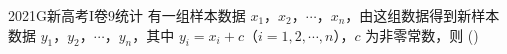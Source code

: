 
\begin{problem}{2021}{G}{新高考I卷}{9}{统计}
有一组样本数据 $ x_1 $，$ x_2 $，$ \cdots $，$ x_n $，由这组数据得到新样本数据 $ y_1 $，$ y_2 $，$ \cdots $，$ y_n $，其中 $ y_i=x_i+c $（$ i=1,2,\cdots,n $），$ c $ 为非零常数，则 (\hspace{1cm})
\end{problem}

\begin{choices}
\end{choices}